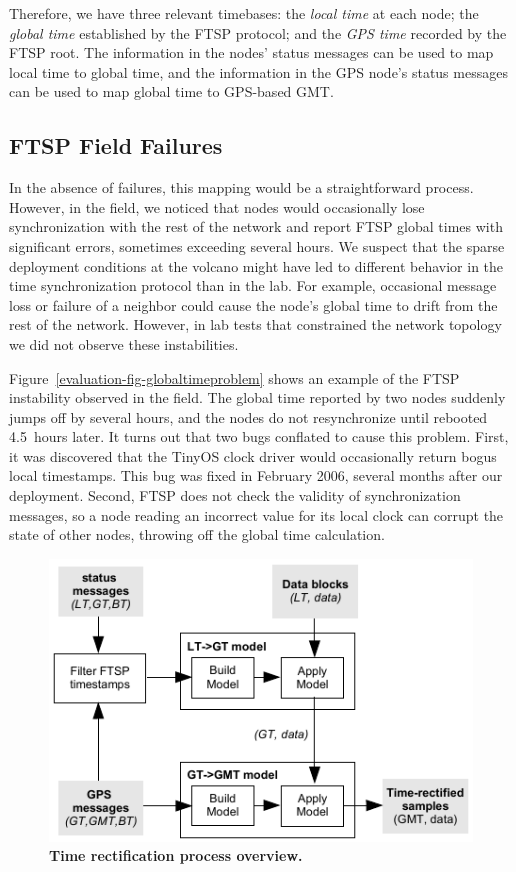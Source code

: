 Therefore, we have three relevant timebases: the \textit{local time} at each
node; the \textit{global time} established by the FTSP protocol; and the
\textit{GPS time} recorded by the FTSP root. The information in the nodes'
status messages can be used to map local time to global time, and the
information in the GPS node's status messages can be used to map global time
to GPS-based GMT.

\subsection{FTSP Field Failures}
\label{evaluation-timing-deploymentfailures}

In the absence of failures, this mapping would be a straightforward process.
However, in the field, we noticed that nodes would occasionally lose
synchronization with the rest of the network and report FTSP global times
with significant errors, sometimes exceeding several hours. We suspect that
the sparse deployment conditions at the volcano might have led to different
behavior in the time synchronization protocol than in the lab. For example,
occasional message loss or failure of a neighbor could cause the node's
global time to drift from the rest of the network. However, in lab tests that
constrained the network topology we did not observe these instabilities.

Figure~\ref{evaluation-fig-globaltimeproblem} shows an example of the FTSP
instability observed in the field. The global time reported by two nodes
suddenly jumps off by several hours, and the nodes do not resynchronize until
rebooted 4.5~hours later. It turns out that two bugs conflated to cause this
problem. First, it was discovered that the TinyOS clock driver would
occasionally return bogus local timestamps. This bug was fixed in February
2006, several months after our deployment. Second, FTSP does not check the
validity of synchronization messages, so a node reading an incorrect value
for its local clock can corrupt the state of other nodes, throwing off the
global time calculation.

\begin{figure}[t]
\begin{center}
\includegraphics[width=0.8\hsize]{./5-evaluation/figs/timing/RectificationCartoon/cartoon.pdf}
\end{center}
\caption{\textbf{Time rectification process overview.}}
\label{evaluation-fig-rectificationcartoon}
\end{figure}

